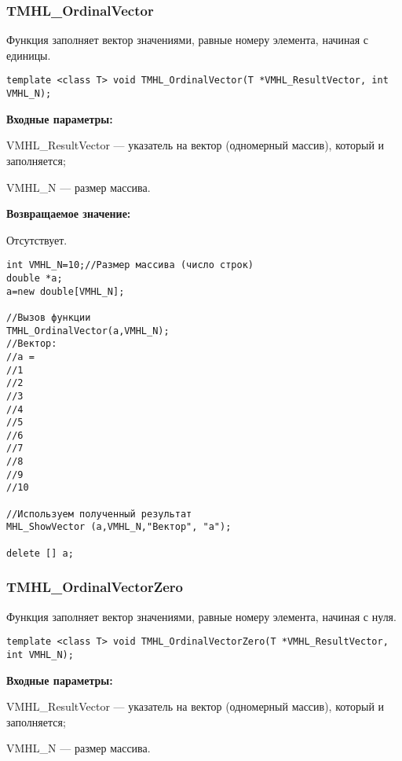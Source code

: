 \documentclass[a4paper,12pt]{article}
\begin{document}
\subsubsection{TMHL\_OrdinalVector}\label{TMHL_OrdinalVector}

Функция заполняет вектор значениями, равные номеру элемента, начиная с единицы.


\begin{lstlisting}[label=code_syntax_TMHL_OrdinalVector,caption=Синтаксис]
template <class T> void TMHL_OrdinalVector(T *VMHL_ResultVector, int VMHL_N);
\end{lstlisting}

\textbf{Входные параметры:}

 VMHL\_ResultVector --- указатель на вектор (одномерный массив), который и заполняется;
 
 VMHL\_N --- размер массива.

\textbf{Возвращаемое значение:}

Отсутствует.


\begin{lstlisting}[label=code_use_TMHL_OrdinalVector,caption=Пример использования]
int VMHL_N=10;//Размер массива (число строк)
double *a;
a=new double[VMHL_N];

//Вызов функции
TMHL_OrdinalVector(a,VMHL_N);
//Вектор:
//a =	
//1
//2
//3
//4
//5
//6
//7
//8
//9
//10

//Используем полученный результат
MHL_ShowVector (a,VMHL_N,"Вектор", "a");

delete [] a;
\end{lstlisting}

\subsubsection{TMHL\_OrdinalVectorZero}\label{TMHL_OrdinalVectorZero}

Функция заполняет вектор значениями, равные номеру элемента, начиная с нуля.


\begin{lstlisting}[label=code_syntax_TMHL_OrdinalVectorZero,caption=Синтаксис]
template <class T> void TMHL_OrdinalVectorZero(T *VMHL_ResultVector, int VMHL_N);
\end{lstlisting}

\textbf{Входные параметры:}

 VMHL\_ResultVector --- указатель на вектор (одномерный массив), который и заполняется;
 
 VMHL\_N --- размер массива.
\end{document}
